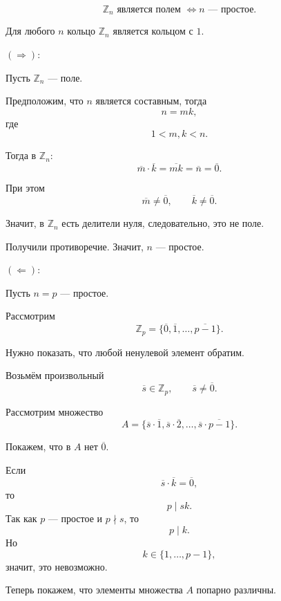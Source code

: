 \begin{theorem}
    \[
        \mathbb{Z}_n \text{ является полем } \Longleftrightarrow n \text{ --- простое.}
    \]
\end{theorem}

\begin{Proof}
    Для любого $n$ кольцо $\mathbb{Z}_n$ является кольцом с $1$.

    \bigskip

    {\bf $(\Rightarrow):$}

    Пусть $\mathbb{Z}_n$ --- поле.

    Предположим, что $n$ является составным, тогда
    \[
        n = mk,
    \]
    где
    \[
        1 < m,k < n.
    \]

    Тогда в $\mathbb{Z}_n$:
    \[
        \overline{m}\cdot \overline{k}
        =
        \overline{mk}
        =
        \overline{n}
        =
        \overline{0}.
    \]

    При этом
    \[
        \overline{m}\neq \overline{0},
        \qquad
        \overline{k}\neq \overline{0}.
    \]

    Значит, в $\mathbb{Z}_n$ есть делители нуля, следовательно, это не поле.

    Получили противоречие. Значит, $n$ --- простое.

    \bigskip

    {\bf $(\Leftarrow):$}

    Пусть $n = p$ --- простое.

    Рассмотрим
    \[
        \mathbb{Z}_p =
        \{\overline{0},\overline{1},\ldots,\overline{p-1}\}.
    \]

    Нужно показать, что любой ненулевой элемент обратим.

    Возьмём произвольный
    \[
        \overline{s}\in \mathbb{Z}_p,\qquad \overline{s}\neq \overline{0}.
    \]

    Рассмотрим множество
    \[
        A =
        \{\overline{s}\cdot\overline{1},
        \overline{s}\cdot\overline{2},
        \ldots,
        \overline{s}\cdot\overline{p-1}\}.
    \]

    Покажем, что в $A$ нет $\overline{0}$.

    Если
    \[
        \overline{s}\cdot\overline{k}=\overline{0},
    \]
    то
    \[
        p\mid sk.
    \]
    Так как $p$ --- простое и $p\nmid s$, то
    \[
        p\mid k.
    \]
    Но
    \[
        k\in\{1,\ldots,p-1\},
    \]
    значит, это невозможно.

    Теперь покажем, что элементы множества $A$ попарно различны.


\end{Proof}
